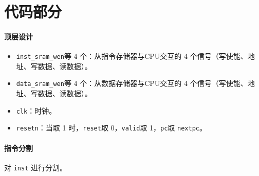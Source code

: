 \documentclass[UTF8]{ctexart}
\begin{document}
\BgThispage

\section{代码部分}
\paragraph{顶层设计}
\begin{itemize}
    \item \verb!inst_sram_wen!等 4 个：从指令存储器与CPU交互的 4 个信号（写使能、地址、写数据、读数据）。
    \item \verb!data_sram_wen!等 4 个：从数据存储器与CPU交互的 4 个信号（写使能、地址、写数据、读数据）。
    \item \verb!clk!：时钟。
    \item \verb!resetn!：当取 1 时，\verb!reset!取 0，\verb!valid!取 1，\verb!pc!取 \verb!nextpc!。
\end{itemize}

\paragraph{指令分割}
对 \verb!inst! 进行分割。
\end{document}
